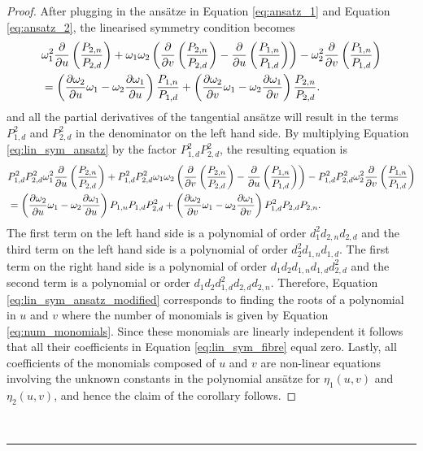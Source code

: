 \begin{proof}
 After plugging in the ans\"atze in Equation \eqref{eq:ansatz_1} and Equation \eqref{eq:ansatz_2}, the linearised symmetry condition becomes
 \begin{equation}
   \begin{split}
     &\omega_1^2 \pdv{}{u}\left(\frac{P_{2,n}}{P_{2,d}}\right)+\omega_1\omega_2\left(\pdv{}{v}\left(\frac{P_{2,n}}{P_{2,d}}\right)-\pdv{}{u}\left(\frac{P_{1,n}}{P_{1,d}}\right)\right)-\omega_2^2\pdv{}{v}\left(\frac{P_{1,n}}{P_{1,d}}\right)\\
     &=\left(\pdv{\omega_2}{u}\omega_1-\omega_2\pdv{\omega_1}{u}\right)\frac{P_{1,n}}{P_{1,d}}+\left(\pdv{\omega_2}{v}\omega_1-\omega_2\pdv{\omega_1}{v}\right)\frac{P_{2,n}}{P_{2,d}}.
     \end{split}
\label{eq:lin_sym_ansatz}
\end{equation}
and all the partial derivatives of the tangential ans\"atze will result in the terms $P_{1,d}^2$ and $P_{2,d}^2$ in the denominator on the left hand side. By multiplying Equation \eqref{eq:lin_sym_ansatz} by the factor $P_{1,d}^2 P_{2,d}^2$, the resulting equation is
 \begin{equation}
   \begin{split}
     &P_{1,d}^2 P_{2,d}^2\omega_1^2 \pdv{}{u}\left(\frac{P_{2,n}}{P_{2,d}}\right)+P_{1,d}^2 P_{2,d}^2\omega_1\omega_2\left(\pdv{}{v}\left(\frac{P_{2,n}}{P_{2,d}}\right)-\pdv{}{u}\left(\frac{P_{1,n}}{P_{1,d}}\right)\right)-P_{1,d}^2 P_{2,d}^2\omega_2^2\pdv{}{v}\left(\frac{P_{1,n}}{P_{1,d}}\right)\\
     &=\left(\pdv{\omega_2}{u}\omega_1-\omega_2\pdv{\omega_1}{u}\right)P_{1,n}P_{1,d} P_{2,d}^2+\left(\pdv{\omega_2}{v}\omega_1-\omega_2\pdv{\omega_1}{v}\right)P_{1,d}^2 P_{2,d}P_{2,n}.
     \end{split}
\label{eq:lin_sym_ansatz_modified}
\end{equation}
\noindent The first term on the left hand side is a polynomial of order $d_1^2 d_{2,n} d_{2,d}$ and the third term on the left hand side is a polynomial of order $d_2^2d_{1,n}d_{1,d}$. The first term on the right hand side is a polynomial of order $d_1d_2d_{1,n}d_{1,d}d_{2,d}^2$ and the second term is a polynomial or order $d_1d_2d_{1,d}^2d_{2,d}d_{2,n}$. Therefore, Equation \eqref{eq:lin_sym_ansatz_modified} corresponds to finding the roots of a polynomial in $u$ and $v$ where the number of monomials is given by Equation \eqref{eq:num_monomials}. Since these monomials are linearly independent it follows that all their coefficients in Equation \eqref{eq:lin_sym_fibre} equal zero. Lastly, all coefficients of the monomials composed of $u$ and $v$ are non-linear equations involving the unknown constants in the polynomial ans\"atze for $\eta_1(u,v)$ and $\eta_2(u,v)$, and hence the claim of the corollary follows.
\end{proof}
\dotfill\\
\hrule

